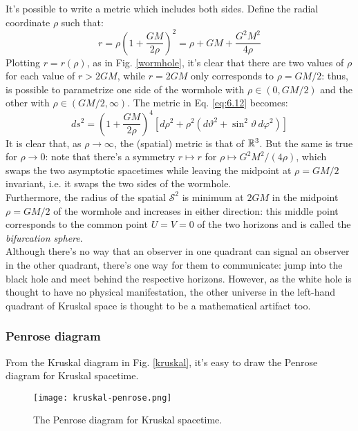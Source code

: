 It's possible to write a metric which includes both sides. Define the radial coordinate $ \rho $ such that:
\begin{equation*}
  r = \rho \left( 1 + \frac{GM}{2\rho} \right)^2 = \rho + GM + \frac{G^2 M^2}{4 \rho}
\end{equation*}
Plotting $ r = r(\rho) $, as in Fig. \ref{wormhole}, it's clear that there are two values of $ \rho $ for each value of $ r > 2GM $, while $ r = 2GM $ only corresponds to $ \rho = GM/2 $: thus, is possible to parametrize one side of the wormhole with $ \rho \in (0, GM/2) $ and the other with $ \rho \in (GM/2, \infty) $. The metric in Eq. \ref{eq:6.12} becomes:
\begin{equation}
  ds^2 = \left( 1 + \frac{GM}{2\rho} \right)^4 \left[ d\rho^2 + \rho^2 \left( d\vartheta^2 + \sin^2 \vartheta \, d\varphi^2 \right) \right]
  \label{eq:6.13}
\end{equation}
It is clear that, as $ \rho \rightarrow \infty $, the (spatial) metric is that of $ \mathbb{R}^3 $. But the same is true for $ \rho \rightarrow 0 $: note that there's a symmetry $ r \mapsto r $ for $ \rho \mapsto G^2 M^2 / (4\rho) $, which swaps the two asymptotic spacetimes while leaving the midpoint at $ \rho = GM/2 $ invariant, i.e. it swaps the two sides of the wormhole.\\
Furthermore, the radius of the spatial $ \mathcal{S}^2 $ is minimum at $ 2GM $ in the midpoint $ \rho = GM/2 $ of the wormhole and increases in either direction: this middle point corresponds to the common point $ U = V = 0 $ of the two horizons and is called the \textit{bifurcation sphere}.\\
Although there's no way that an observer in one quadrant can signal an observer in the other quadrant, there's one way for them to communicate: jump into the black hole and meet behind the respective horizons. However, as the white hole is thought to have no physical manifestation, the other universe in the left-hand quadrant of Kruskal space is thought to be a mathematical artifact too.

\subsubsection{Penrose diagram}

From the Kruskal diagram in Fig. \ref{kruskal}, it's easy to draw the Penrose diagram for Kruskal spacetime.

\begin{figure}
  \centering
  \texttt{[image: kruskal-penrose.png]}
  \caption{The Penrose diagram for Kruskal spacetime.}
  \label{kru-penr}
\end{figure}

